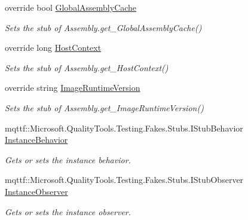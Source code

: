 \begin{DoxyCompactItemize}
override bool \hyperlink{class_system_1_1_reflection_1_1_fakes_1_1_stub_assembly_a3fe7699e6644bd13c0599bdb090c236a}{Global\-Assembly\-Cache}
\begin{DoxyCompactList}\small\item\em Sets the stub of Assembly.\-get\-\_\-\-Global\-Assembly\-Cache()\end{DoxyCompactList}\item 
override long \hyperlink{class_system_1_1_reflection_1_1_fakes_1_1_stub_assembly_a6dfb958fa845305cd2401e04f09b0a6a}{Host\-Context}
\begin{DoxyCompactList}\small\item\em Sets the stub of Assembly.\-get\-\_\-\-Host\-Context()\end{DoxyCompactList}\item 
override string \hyperlink{class_system_1_1_reflection_1_1_fakes_1_1_stub_assembly_aea494a368a93b8df1ec7b812537df542}{Image\-Runtime\-Version}
\begin{DoxyCompactList}\small\item\em Sets the stub of Assembly.\-get\-\_\-\-Image\-Runtime\-Version()\end{DoxyCompactList}\item 
mqttf\-::\-Microsoft.\-Quality\-Tools.\-Testing.\-Fakes.\-Stubs.\-I\-Stub\-Behavior \hyperlink{class_system_1_1_reflection_1_1_fakes_1_1_stub_assembly_aad675ab9c602f0e72f015ef3d44d07fc}{Instance\-Behavior}
\begin{DoxyCompactList}\small\item\em Gets or sets the instance behavior.\end{DoxyCompactList}\item 
mqttf\-::\-Microsoft.\-Quality\-Tools.\-Testing.\-Fakes.\-Stubs.\-I\-Stub\-Observer \hyperlink{class_system_1_1_reflection_1_1_fakes_1_1_stub_assembly_a9c2e6c1d422376c4cd941022ce312b6c}{Instance\-Observer}
\begin{DoxyCompactList}\small\item\em Gets or sets the instance observer.\end{DoxyCompactList}\item 

\end{DoxyCompactItemize}
